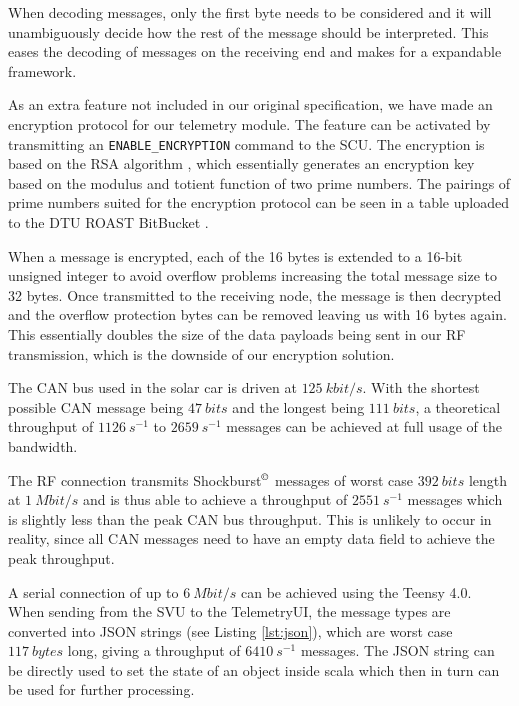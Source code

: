 \documentclass[a4paper,conference]{IEEEtran}
\begin{document}
When decoding messages, only the first byte needs to be considered and it will unambiguously decide how the rest of the message should be interpreted. This eases the decoding of messages on the receiving end and makes for a expandable framework. 

As an extra feature not included in our original specification, we have made an encryption protocol for our telemetry module. The feature can be activated by transmitting an \texttt{ENABLE\_ENCRYPTION} command to the SCU. The encryption is based on the RSA algorithm \cite{rsa}, which essentially generates an encryption key based on the modulus and totient function of two prime numbers. The pairings of prime numbers suited for the encryption protocol can be seen in a table uploaded to the DTU ROAST BitBucket \cite{prime}. 

When a message is encrypted, each of the 16 bytes is extended to a 16-bit unsigned integer to avoid overflow problems increasing the total message size to 32 bytes. Once transmitted to the receiving node, the message is then decrypted and the overflow protection bytes can be removed leaving us with 16 bytes again. This essentially doubles the size of the data payloads being sent in our RF transmission, which is the downside of our encryption solution.

The CAN bus used in the solar car is driven at $\SI{125}{kbit/s}$. With the shortest possible CAN message being $\SI{47}{bits}$ and the longest being $\SI{111}{bits}$, a theoretical throughput of $\SI{1126}{s^{-1}}$ to $\SI{2659}{s^{-1}}$ messages can be achieved at full usage of the bandwidth.%

The RF connection transmits Shockburst$^\copyright$ messages of worst case $\SI{392}{bits}$ length at $\SI{1}{Mbit/s}$ and is thus able to achieve a throughput of $\SI{2551}{s^{-1}}$ messages which is slightly less than the peak CAN bus throughput. This is unlikely to occur in reality, since all CAN messages need to have an empty data field to achieve the peak throughput.

A serial connection of up to $\SI{6}{Mbit/s}$ can be achieved using the Teensy 4.0. When sending from the SVU to the TelemetryUI, the message types are converted into JSON \cite{json} strings (see Listing \ref{lst:json}), which are worst case $\SI{117}{bytes}$ long, giving a throughput of $\SI{6410}{s^{-1}}$ messages. The JSON string can be directly used to set the state of an object inside scala which then in turn can be used for further processing.
\end{document}
